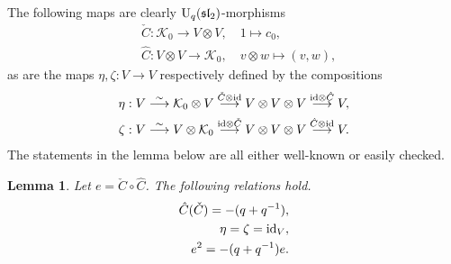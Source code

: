 \documentclass[12pt]{amsart}
\newtheorem{lemma}[theorem]{Lemma}
\theoremstyle{definition}
\theoremstyle{remark}
\numberwithin{equation}{section}
\newcommand{\CK}{{\mathcal K}}
\newcommand{\id}{{\rm{id}}}
\newcommand{\U}{{\rm{U}}}
\newcommand{\fsl}{{\mathfrak {sl}}}
\begin{document}
The following maps are clearly $\U_q(\fsl_2)$-morphisms
\begin{eqnarray}\label{eq:curls}
&\check{C}: \CK_0\longrightarrow V\otimes V, \quad 1\mapsto c_0,  \label{eq:cup}\\
&\hat{C}:  V\otimes V \longrightarrow \CK_0, \quad v\otimes w\mapsto (v, w), \label{eq:cap}
\end{eqnarray}
as are the maps $\eta, \zeta: V\longrightarrow V$ respectively defined by the compositions 
\[
\begin{aligned}
\eta: V\stackrel{\sim}\longrightarrow \CK_0\otimes V \stackrel{\check{C}\otimes\id}\longrightarrow V
 \otimes V \otimes V \stackrel{\id\otimes \hat{C}}\longrightarrow V, 
\\
\zeta: V\stackrel{\sim}\longrightarrow V\otimes\CK_0 \stackrel{\id\otimes \check{C}}\longrightarrow V 
\otimes V \otimes V \stackrel{\hat{C}\otimes \id}\longrightarrow V. 
\end{aligned}
\]
The statements in the lemma below are all either well-known  or easily checked.
\begin{lemma} \label{eq:cup-cap} Let $e= \check{C}\circ\hat{C}$. The following relations hold. 
\begin{eqnarray}
 \hat{C}(\check{C})=-(q+q^{-1}), \label{eq:loop-c}\\
\eta=\zeta=\id_V,  \label{eq:straighten}\\
e^2=-(q+q^{-1}) e.  \label{eq:e-op}
\end{eqnarray}
\end{lemma}


%
%
\end{document}
